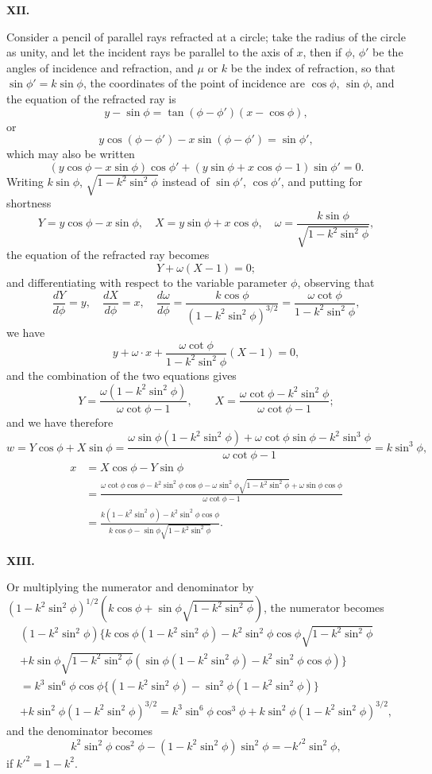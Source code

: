 \documentclass[11pt,a4paper]{book}
\begin{document}
\begin{center}
\clearpage
\noindent\textbf{XII.}

Consider a pencil of parallel rays refracted at a circle; take the radius of
the circle as unity, and let the incident rays be parallel to the axis of $x$, then if
$\phi$, $\phi'$ be the angles of incidence and refraction, and $\mu$ or $k$ be the index of
refraction, so that $\sin\phi' = k\sin\phi$, the coordinates of the point of incidence are
$\cos\phi$, $\sin\phi$, and the equation of the refracted ray is
\[y - \sin\phi = \tan(\phi - \phi')(x - \cos\phi),\]
or
\[y\cos(\phi - \phi') - x\sin(\phi - \phi') = \sin\phi',\]
which may also be written
\[(y\cos\phi - x\sin\phi)\cos\phi' + (y\sin\phi + x\cos\phi - 1)\sin\phi' = 0.\]
Writing $k\sin\phi$, $\sqrt{1-k^2\sin^2\phi}$ instead of $\sin\phi'$, $\cos\phi'$, and putting for
shortness
\[Y = y\cos\phi - x\sin\phi,\quad X = y\sin\phi + x\cos\phi,\quad
\omega = \frac{k\sin\phi}{\sqrt{1-k^2\sin^2\phi}},\]
the equation of the refracted ray becomes
\[Y + \omega(X-1) = 0;\]
and differentiating with respect to the variable parameter $\phi$, observing that
\[\frac{dY}{d\phi} = y,\quad \frac{dX}{d\phi} = x,\quad
\frac{d\omega}{d\phi} = \frac{k\cos\phi}{(1-k^2\sin^2\phi)^{3/2}} = \frac{\omega\cot\phi}{1-k^2\sin^2\phi},\]
we have
\[y + \omega\cdot x + \frac{\omega\cot\phi}{1-k^2\sin^2\phi}(X-1) = 0,\]
and the combination of the two equations gives
\[Y = \frac{\omega(1-k^2\sin^2\phi)}{\omega\cot\phi - 1},\qquad
X = \frac{\omega\cot\phi - k^2\sin^2\phi}{\omega\cot\phi - 1};\]
and we have therefore
\[w = Y\cos\phi + X\sin\phi = \frac{\omega\sin\phi(1-k^2\sin^2\phi) + \omega\cot\phi\sin\phi - k^2\sin^3\phi}{\omega\cot\phi - 1} = k\sin^3\phi,\]
\begin{align*}
x &= X\cos\phi - Y\sin\phi\\
&= \frac{\omega\cot\phi\cos\phi - k^2\sin^2\phi\cos\phi - \omega\sin^2\phi\sqrt{1-k^2\sin^2\phi} + \omega\sin\phi\cos\phi}{\omega\cot\phi - 1}\\
&= \frac{k(1-k^2\sin^2\phi) - k^2\sin^2\phi\cos\phi}{k\cos\phi - \sin\phi\sqrt{1-k^2\sin^2\phi}}.
\end{align*}

\noindent\textbf{XIII.}

Or multiplying the numerator and denominator by $(1-k^2\sin^2\phi)^{1/2}(k\cos\phi + \sin\phi\sqrt{1-k^2\sin^2\phi})$, the numerator becomes
\begin{multline*}
(1-k^2\sin^2\phi)\{k\cos\phi(1-k^2\sin^2\phi) - k^2\sin^2\phi\cos\phi\sqrt{1-k^2\sin^2\phi}\\
+ k\sin\phi\sqrt{1-k^2\sin^2\phi}(\sin\phi(1-k^2\sin^2\phi) - k^2\sin^2\phi\cos\phi)\}\\
= k^3\sin^6\phi\cos\phi\{(1-k^2\sin^2\phi) - \sin^2\phi(1-k^2\sin^2\phi)\}\\
+ k\sin^2\phi(1-k^2\sin^2\phi)^{3/2} = k^3\sin^6\phi\cos^3\phi + k\sin^2\phi(1-k^2\sin^2\phi)^{3/2},
\end{multline*}
and the denominator becomes
\[k^2\sin^2\phi\cos^2\phi - (1-k^2\sin^2\phi)\sin^2\phi = -k'^2\sin^2\phi,\]
if $k'^2 = 1-k^2$.


\end{center}
\end{document}
